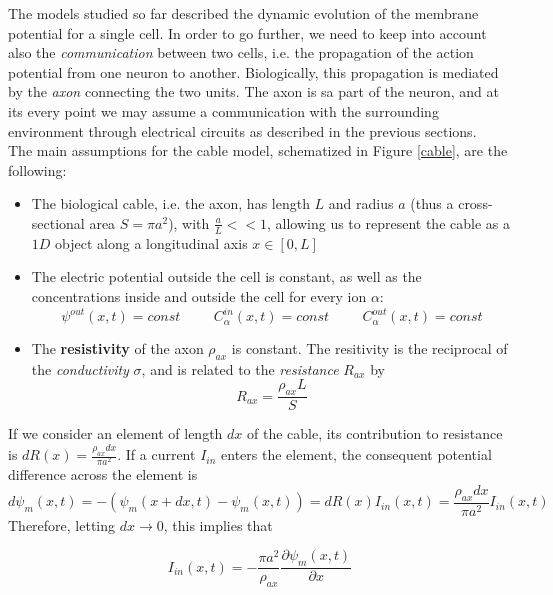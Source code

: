 \documentclass[12pt, a4paper]{report}
\begin{document}
The models studied so far described the dynamic evolution of the membrane potential  for a single cell. In order to go further, we need to keep into account also the \textit{communication} between two cells, i.e. the propagation of the action potential from one neuron to another. Biologically, this propagation is mediated by the \textit{axon} connecting the two units. The axon is sa part of the neuron, and at its every point we may assume a communication with the surrounding environment through electrical circuits as described in the previous sections.\\
The main assumptions for the cable model, schematized in Figure \ref{cable}, are the following:

\begin{itemize}
	
	\item The biological cable, i.e. the axon, has length $L$ and radius $a$ (thus a cross-sectional area  $S=\pi a^2$), with $\frac{a}{L} << 1$, allowing us to represent the cable as a $1D$ object along a longitudinal axis $ x \in [0,L]$
	
	\item The electric potential outside the cell is constant, as well as the concentrations inside and outside the cell for every ion $\alpha$: 
	$$ \psi^{out}(x,t) = const  \hspace{1cm} C_\alpha^{in}(x,t)  = const \hspace{1cm} C_\alpha^{out}(x,t)  = const$$
	
	\item The \textbf{resistivity} of the axon $\rho_{ax}$ is constant. The resitivity is the reciprocal of the \textit{conductivity} $\sigma$, and is related to the \textit{resistance} $R_{ax}$ by
	 $$ R_{ax} = \frac{\rho_{ax} L}{S} $$
	
	
\end{itemize}


If we consider an element of length $dx$ of the cable, its contribution to resistance is $dR(x) = \frac{\rho_{ax} dx}{\pi a^2}$. If a current $I_{in}$ enters the element, the consequent potential difference across the element is 
$$ d\psi_m(x,t) = - \left(\psi_m(x+dx,t) - \psi_m(x,t)\right) = dR(x)I_{in}(x,t) = \frac{\rho_{ax} dx}{\pi a^2} I_{in}(x,t)$$ Therefore, letting $dx \rightarrow 0$, this implies that

\begin{equation}
I_{in}(x,t) = -\frac{\pi a^2}{\rho_{ax}}\frac{\partial \psi_m(x,t)}{\partial x}
\end{equation}
\end{document}
